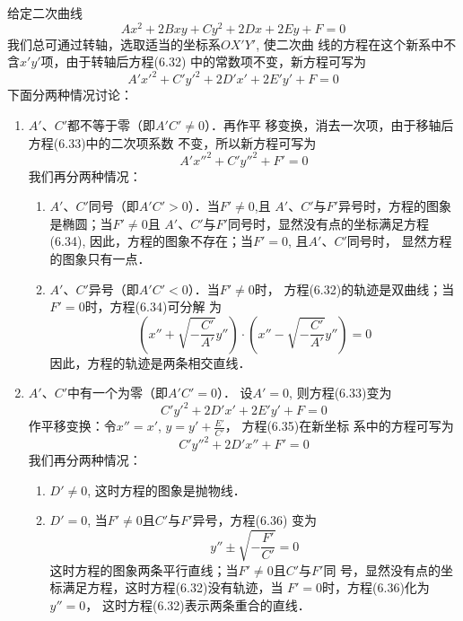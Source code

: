 给定二次曲线
\begin{equation}
 Ax^2+2Bxy+Cy^2+2Dx+2Ey+F=0   
\end{equation}
我们总可通过转轴，选取适当的坐标系$OX'Y'$, 使二次曲
线的方程在这个新系中不含$x'y'$项，由于转轴后方程(6.32)
中的常数项不变，新方程可写为
\begin{equation}
    A'{x'}^2+C'{y'}^2+2D'x'+2E'y'+F=0
\end{equation}
下面分两种情况讨论：
\begin{enumerate}
    \item $A'$、$C'$都不等于零（即$A'C'\ne 0$）．再作平
移变换，消去一次项，由于移轴后方程(6.33)中的二次项系数
不变，所以新方程可写为
\begin{equation}
    A'{x''}^2+C'{y''}^2+F'=0
\end{equation}
我们再分两种情况：
\begin{enumerate}
\item $A'$、$C'$同号（即$A'C'>0$）．当$F'\ne 0$,且
$A'$、$C'$与$F'$异号时，方程的图象是椭圆；当$F'\ne 0$且
$A'$、$C'$与$F'$同号时，显然没有点的坐标满足方程(6.34), 
因此，方程的图象不存在；当$F'= 0$, 且$A'$、$C'$同号时，
显然方程的图象只有一点．
\item $A'$、$C'$异号（即$A'C'<0$）．当$F'\ne 0$时，
方程(6.32)的轨迹是双曲线；当$F'= 0$时，方程(6.34)可分解
为
\[\left(x''+\sqrt{-\frac{C'}{A'}}y''\right)\cdot \left(x''-\sqrt{-\frac{C'}{A'}}y''\right)=0\]
因此，方程的轨迹是两条相交直线．
\end{enumerate}
\item $A'$、$C'$中有一个为零（即$A'C'=0$）．
设$A'=0$, 则方程(6.33)变为
\begin{equation}
    C'{y'}^2+2D'x'+2E'y'+F=0
\end{equation}
作平移变换：令$x''=x'$, $y=y'+\frac{E'}{C'}$，
方程(6.35)在新坐标
系中的方程可写为
\begin{equation}
    C'{y''}^2+2D'x''+F'=0
\end{equation}
我们再分两种情况：
\begin{enumerate}
    \item $D'\ne 0$, 这时方程的图象是抛物线．
    \item $D'=0$, 当$F'\ne 0$且$C'$与$F'$异号，方程(6.36)
    变为
    \[y''\pm \sqrt{-\frac{F'}{C'}}=0\]
    这时方程的图象两条平行直线；当$F'\ne 0$且$C'$与$F'$同
号，显然没有点的坐标满足方程，这时方程(6.32)没有轨迹，当
$F'=0$时，方程(6.36)化为$y''=0$，
这时方程(6.32)表示两条重合的直线．
\end{enumerate}
\end{enumerate}


